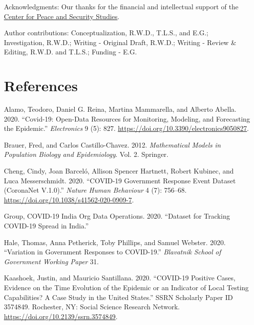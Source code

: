 \documentclass[10pt,letterpaper]{article}
\newlength{\cslhangindent}
\newenvironment{cslreferences}%
  {\setlength{\parindent}{0pt}%
  \everypar{\setlength{\hangindent}{\cslhangindent}}\ignorespaces}%
  {\par}
\begin{document}
Acknowledgments: Our thanks for the financial and intellectual support
of the \href{www.ucsd.cpass.edu}{Center for Peace and Security Studies}.

Author contributions: Conceptualization, R.W.D., T.L.S., and E.G.;
Investigation, R.W.D.; Writing - Original Draft, R.W.D.; Writing -
Review \& Editing, R.W.D. and T.L.S.; Funding - E.G.

\hypertarget{references}{%
\section*{References}\label{references}}

\hypertarget{refs}{}
\begin{cslreferences}
\leavevmode\hypertarget{ref-alamoCovid19OpenDataResources2020}{}%
Alamo, Teodoro, Daniel G. Reina, Martina Mammarella, and Alberto Abella.
2020. ``Covid-19: Open-Data Resources for Monitoring, Modeling, and
Forecasting the Epidemic.'' \emph{Electronics} 9 (5): 827.
\url{https://doi.org/10.3390/electronics9050827}.

\leavevmode\hypertarget{ref-brauerMathematicalModelsPopulation2012}{}%
Brauer, Fred, and Carlos Castillo-Chavez. 2012. \emph{Mathematical
Models in Population Biology and Epidemiology}. Vol. 2. Springer.

\leavevmode\hypertarget{ref-chengCOVID19GovernmentResponse2020a}{}%
Cheng, Cindy, Joan Barceló, Allison Spencer Hartnett, Robert Kubinec,
and Luca Messerschmidt. 2020. ``COVID-19 Government Response Event
Dataset (CoronaNet V.1.0).'' \emph{Nature Human Behaviour} 4 (7):
756--68. \url{https://doi.org/10.1038/s41562-020-0909-7}.

\leavevmode\hypertarget{ref-covid19indiaorg2020tracker}{}%
Group, COVID-19 India Org Data Operations. 2020. ``Dataset for Tracking
COVID-19 Spread in India.''

\leavevmode\hypertarget{ref-haleVariationGovernmentResponses2020}{}%
Hale, Thomas, Anna Petherick, Toby Phillips, and Samuel Webster. 2020.
``Variation in Government Responses to COVID-19.'' \emph{Blavatnik
School of Government Working Paper} 31.

\leavevmode\hypertarget{ref-kaashoekCOVID19PositiveCases2020a}{}%
Kaashoek, Justin, and Mauricio Santillana. 2020. ``COVID-19 Positive
Cases, Evidence on the Time Evolution of the Epidemic or an Indicator of
Local Testing Capabilities? A Case Study in the United States.'' SSRN
Scholarly Paper ID 3574849. Rochester, NY: Social Science Research
Network. \url{https://doi.org/10.2139/ssrn.3574849}.


\end{cslreferences}
\end{document}
